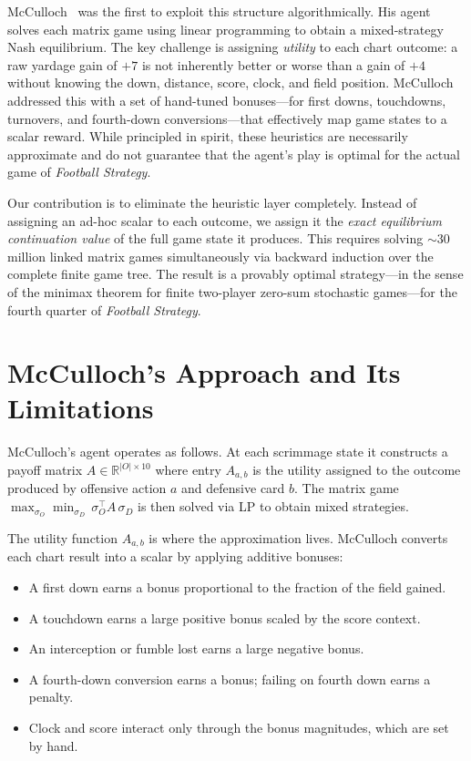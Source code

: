 \documentclass[11pt,letterpaper]{article}
\begin{document}
McCulloch~\cite{mcculloch} was the first to exploit this structure algorithmically.  His
agent solves each matrix game using linear programming to obtain a mixed-strategy Nash
equilibrium.  The key challenge is assigning \emph{utility} to each chart outcome: a raw
yardage gain of $+7$ is not inherently better or worse than a gain of $+4$ without knowing
the down, distance, score, clock, and field position.  McCulloch addressed this with a set
of hand-tuned bonuses---for first downs, touchdowns, turnovers, and fourth-down
conversions---that effectively map game states to a scalar reward.  While principled in
spirit, these heuristics are necessarily approximate and do not guarantee that the agent's
play is optimal for the actual game of \emph{Football Strategy}.

Our contribution is to eliminate the heuristic layer completely.  Instead of assigning an
ad-hoc scalar to each outcome, we assign it the \emph{exact equilibrium continuation value}
of the full game state it produces.  This requires solving ${\sim}30$ million linked matrix
games simultaneously via backward induction over the complete finite game tree.  The result
is a provably optimal strategy---in the sense of the minimax theorem for finite two-player
zero-sum stochastic games---for the fourth quarter of \emph{Football Strategy}.

\section{McCulloch's Approach and Its Limitations}
\label{sec:mcculloch}

McCulloch's agent operates as follows.  At each scrimmage state it constructs a payoff
matrix $A \in \mathbb{R}^{|O|\times 10}$ where entry $A_{a,b}$ is the utility assigned to
the outcome produced by offensive action $a$ and defensive card $b$.  The matrix game
$\max_{\sigma_O}\min_{\sigma_D}\, \sigma_O^\top A\, \sigma_D$ is then solved via LP to
obtain mixed strategies.

The utility function $A_{a,b}$ is where the approximation lives.  McCulloch converts each
chart result into a scalar by applying additive bonuses:

\begin{itemize}
  \item A first down earns a bonus proportional to the fraction of the field gained.
  \item A touchdown earns a large positive bonus scaled by the score context.
  \item An interception or fumble lost earns a large negative bonus.
  \item A fourth-down conversion earns a bonus; failing on fourth down earns a penalty.
  \item Clock and score interact only through the bonus magnitudes, which are set by hand.
\end{itemize}
\end{document}
